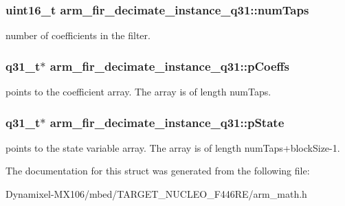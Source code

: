 \subsubsection[{\texorpdfstring{num\+Taps}{numTaps}}]{\setlength{\rightskip}{0pt plus 5cm}uint16\+\_\+t arm\+\_\+fir\+\_\+decimate\+\_\+instance\+\_\+q31\+::num\+Taps}\hypertarget{structarm__fir__decimate__instance__q31_a37915d42b0dc5e3057ebe83110798482}{}\label{structarm__fir__decimate__instance__q31_a37915d42b0dc5e3057ebe83110798482}
number of coefficients in the filter. 
\subsubsection[{\texorpdfstring{p\+Coeffs}{pCoeffs}}]{\setlength{\rightskip}{0pt plus 5cm}q31\+\_\+t$\ast$ arm\+\_\+fir\+\_\+decimate\+\_\+instance\+\_\+q31\+::p\+Coeffs}\hypertarget{structarm__fir__decimate__instance__q31_a030d0391538c2481c5b348fd09a952ff}{}\label{structarm__fir__decimate__instance__q31_a030d0391538c2481c5b348fd09a952ff}
points to the coefficient array. The array is of length num\+Taps. 
\subsubsection[{\texorpdfstring{p\+State}{pState}}]{\setlength{\rightskip}{0pt plus 5cm}q31\+\_\+t$\ast$ arm\+\_\+fir\+\_\+decimate\+\_\+instance\+\_\+q31\+::p\+State}\hypertarget{structarm__fir__decimate__instance__q31_a0ef0ef9e265f7ab873cfc6daa7593fdb}{}\label{structarm__fir__decimate__instance__q31_a0ef0ef9e265f7ab873cfc6daa7593fdb}
points to the state variable array. The array is of length num\+Taps+block\+Size-\/1. 

The documentation for this struct was generated from the following file\+:\begin{DoxyCompactItemize}
\item 
Dynamixel-\/\+M\+X106/mbed/\+T\+A\+R\+G\+E\+T\+\_\+\+N\+U\+C\+L\+E\+O\+\_\+\+F446\+R\+E/arm\+\_\+math.\+h\end{DoxyCompactItemize}
